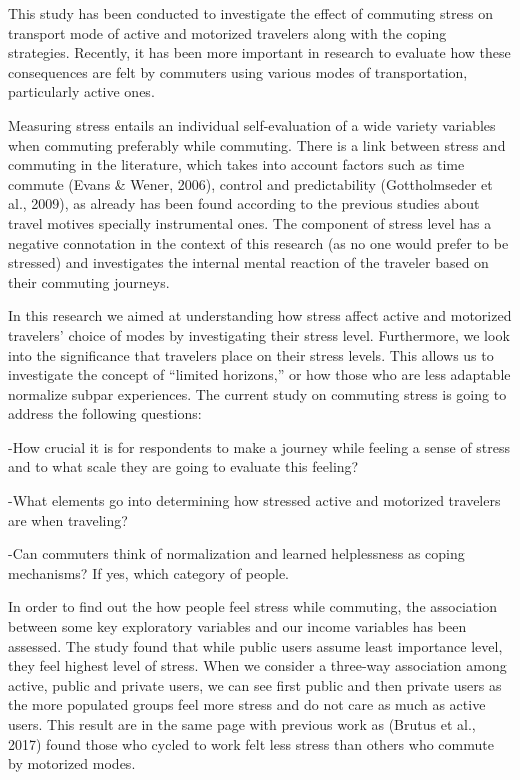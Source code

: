 \documentclass[
11pt, %
oneside, %
english, %
singlespacing, %
]{macthesis} %
\begin{document}
This study has been conducted to investigate the effect of commuting stress on transport mode of active and motorized travelers along with the coping strategies. Recently, it has been more important in research to evaluate how these consequences are felt by commuters using various modes of transportation, particularly active ones.

Measuring stress entails an individual self-evaluation of a wide variety variables when commuting preferably while commuting. There is a link between stress and commuting in the literature, which takes into account factors such as time commute (Evans \& Wener, 2006), control and predictability (Gottholmseder et al., 2009), as already has been found according to the previous studies about travel motives specially instrumental ones. The component of stress level has a negative connotation in the context of this research (as no one would prefer to be stressed) and investigates the internal mental reaction of the traveler based on their commuting journeys.

In this research we aimed at understanding how stress affect active and motorized travelers' choice of modes by investigating their stress level. Furthermore, we look into the significance that travelers place on their stress levels. This allows us to investigate the concept of ``limited horizons,'' or how those who are less adaptable normalize subpar experiences. The current study on commuting stress is going to address the following questions:

-How crucial it is for respondents to make a journey while feeling a sense of stress and to what scale they are going to evaluate this feeling?

-What elements go into determining how stressed active and motorized travelers are when traveling?

-Can commuters think of normalization and learned helplessness as coping mechanisms? If yes, which category of people.

In order to find out the how people feel stress while commuting, the association between some key exploratory variables and our income variables has been assessed. The study found that while public users assume least importance level, they feel highest level of stress. When we consider a three-way association among active, public and private users, we can see first public and then private users as the more populated groups feel more stress and do not care as much as active users. This result are in the same page with previous work as (Brutus et al., 2017) found those who cycled to work felt less stress than others who commute by motorized modes.
\end{document}

